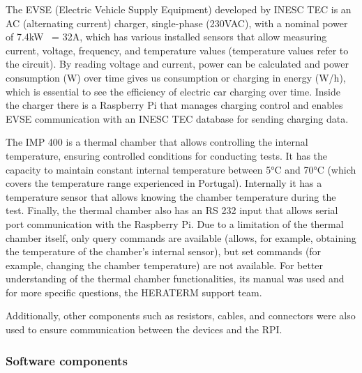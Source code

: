 The EVSE (Electric Vehicle Supply Equipment) developed by INESC TEC is an AC (alternating current) charger, single-phase (230VAC), with a nominal power of 7.4kW ~= 32A, which has various installed sensors that allow measuring current, voltage, frequency, and temperature values (temperature values refer to the circuit). By reading voltage and current, power can be calculated and power consumption (W) over time gives us consumption or charging in energy (W/h), which is essential to see the efficiency of electric car charging over time. Inside the charger there is a Raspberry Pi that manages charging control and enables EVSE communication with an INESC TEC database for sending charging data.

The IMP 400 is a thermal chamber that allows controlling the internal temperature, ensuring controlled conditions for conducting tests. It has the capacity to maintain constant internal temperature between 5°C and 70°C (which covers the temperature range experienced in Portugal). Internally it has a temperature sensor that allows knowing the chamber temperature during the test. Finally, the thermal chamber also has an RS 232 input that allows serial port communication with the Raspberry Pi. Due to a limitation of the thermal chamber itself, only query commands are available (allows, for example, obtaining the temperature of the chamber's internal sensor), but set commands (for example, changing the chamber temperature) are not available. For better understanding of the thermal chamber functionalities, its manual \cite{chamber_manual} was used and for more specific questions, the HERATERM support team.

Additionally, other components such as resistors, cables, and connectors were also used to ensure communication between the devices and the RPI.

\subsubsection{Software components}

